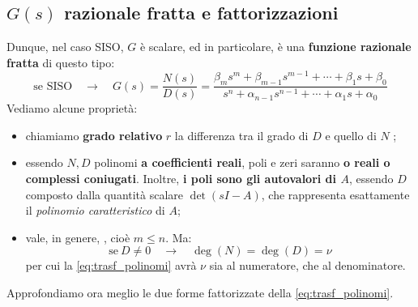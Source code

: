 \subsection{$G(s)$ razionale fratta e fattorizzazioni}
Dunque, nel caso SISO, $G$ è scalare, ed in particolare, è una \textbf{funzione razionale fratta} di questo tipo:
\begin{equation}
\label{eq:trasf_polinomi}
\textrm{se SISO} \quad \rightarrow \quad G(s) = \frac{N(s)}{D(s)} = \frac{\beta_m s^m + \beta_{m -1} s^{m -1} + \cdots + \beta_1 s + \beta_0}{s^n + \alpha_{n - 1}s^{n -1} + \cdots + \alpha_1 s + \alpha_0} 
\end{equation}
Vediamo alcune proprietà:
\begin{itemize}
\item chiamiamo \textbf{grado relativo} $r$ la differenza tra il grado di $D$ e quello di $N$ \rarr {} ;
\item essendo $N,D$ polinomi \textbf{a coefficienti reali}, poli e zeri saranno \textbf{o reali o complessi coniugati}. Inoltre, \textbf{i poli sono gli autovalori di $A$}, essendo $D$   composto dalla quantità scalare $\det(sI-A)$, che rappresenta esattamente il \textit{polinomio caratteristico} di $A$;
\item vale, in genere,  , cioè $m \leq n$. Ma:
\begin{equation*}
\textrm{se} \ D \neq 0 \quad \rightarrow \quad \deg(N) = \deg(D) = \nu
\end{equation*}
per cui la \eqref{eq:trasf_polinomi} avrà $\nu$ sia al numeratore, che al denominatore. 
\end{itemize}

\newpage
{}
\bb
Approfondiamo ora meglio le due forme fattorizzate della \eqref{eq:trasf_polinomi}.

